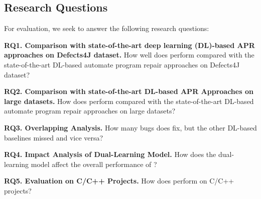 \subsection{Research Questions}

For evaluation, we seek to answer the following research questions:

\noindent\textbf{RQ1. Comparison with state-of-the-art deep learning
  (DL)-based APR approaches on Defects4J dataset.}  How well does
                {\tool} perform compared with the state-of-the-art
               DL-based automate program repair approaches on Defects4J
                dataset?


\noindent\textbf{RQ2. Comparison with state-of-the-art DL-based APR Approaches on large datasets.}  
How does {\tool} perform compared with the state-of-the-art DL-based automate program repair
approaches on large datasets?


\noindent\textbf{RQ3. Overlapping Analysis.} How many bugs does
{\tool} fix, but the other DL-based baselines
                missed and vice versa?

\noindent\textbf{RQ4. Impact Analysis of Dual-Learning Model.} How does the dual-learning model affect the overall performance of {\tool}?


\noindent\textbf{RQ5. Evaluation on C/C++ Projects.} How does {\tool} perform on C/C++ projects?
